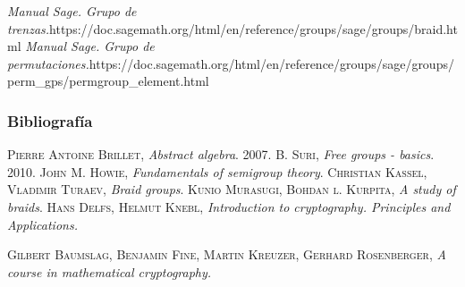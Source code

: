 \documentclass{beamer}
\begin{document}
\begin{frame}
\begin{thebibliography}{X}
\textit{Manual Sage. Grupo de trenzas.}\newline https://doc.sagemath.org/html/en/reference/groups/sage/groups/braid.html
 \textit{Manual Sage. Grupo de permutaciones.}\newline https://doc.sagemath.org/html/en/reference/groups/sage/groups/perm\_gps/\newline permgroup\_element.html
\end{thebibliography}




\end{frame}



\begin{frame}
\frametitle{Bibliografía}

\begin{thebibliography}{X}

\textsc{Pierre Antoine Brillet}, \textit{Abstract algebra}. 2007.
\textsc{B. Suri}, \textit{Free groups - basics}. 2010.
\textsc{John M. Howie}, \textit{Fundamentals of semigroup theory}.
\textsc{Christian Kassel}, \textsc{Vladimir Turaev}, \textit{Braid groups}.
\textsc{Kunio Murasugi}, \textsc{Bohdan l. Kurpita}, \textit{A study of braids}.
\textsc{Hans Delfs}, \textsc{Helmut Knebl}, \textit{Introduction to cryptography. Principles and Applications.}

\textsc{Gilbert Baumslag}, \textsc{Benjamin Fine},  \textsc{Martin Kreuzer}, \textsc{Gerhard Rosenberger}, \textit{A course in mathematical cryptography.}


\end{thebibliography}




\end{frame}
\end{document}
